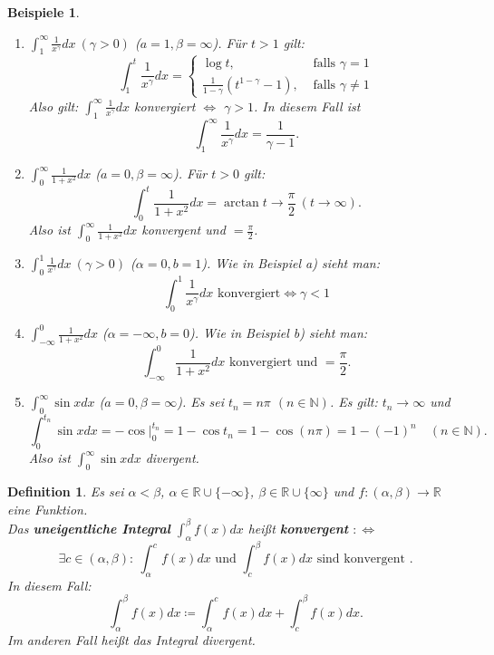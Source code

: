 \documentclass[12pt]{extreport} %
\newcommand{\N}{\mathbb{N}}
\newcommand{\R}{\mathbb{R}}
\theoremstyle{named}
\theoremstyle{itshape}
\newtheorem*{definition}{Definition}
\theoremstyle{normal}
\newtheorem*{beispiele}{Beispiele}
\begin{document}
{\begin{beispiele} ~\
	\begin{enumerate}
		\item $\int_{1}^{\infty} \frac{1}{x^{\gamma}} dx ~(\gamma >0)$ ($a = 1, \beta = \infty$). Für $t > 1$ gilt: \label{11.0:bsp-obigeBspa}
			$$ \int_{1}^{t} \frac{1}{x^{\gamma}} dx = \begin{cases} \log t, & \text{ falls } \gamma = 1 \\ 
			\frac{1}{1 - \gamma} (t^{1 - \gamma} - 1), & \text{ falls } \gamma \neq 1 \end{cases} $$
			Also gilt: $\int_{1}^{\infty} \frac{1}{x^{\gamma}} dx$ konvergiert $\iff$ $\gamma > 1$. In diesem Fall ist
			$$ \int_{1}^{\infty} \frac{1}{x^{\gamma}} dx = \frac{1}{\gamma - 1}. $$
		\item $\int_{0}^{\infty} \frac{1}{1 + x^{2}} dx$ ($a = 0, \beta = \infty$). Für $t > 0$ gilt:
			$$ \int_{0}^{t} \frac{1}{1 + x^{2}} dx = \arctan t \rightarrow \frac{\pi}{2} ~(t \rightarrow \infty). $$ \label{11.0:bsp-obigeBspb}
			Also ist $\int_{0}^{\infty} \frac{1}{1 + x^{2}} dx$ konvergent und $= \frac{\pi}{2}$.
		\item $\int_{0}^{1} \frac{1}{x^{\gamma}} dx ~(\gamma > 0)$ ($\alpha = 0, b = 1$). Wie in Beispiel a) sieht man: \label{11.0:bsp-obigeBspc}
			$$ \int_{0}^{1} \frac{1}{x^{\gamma}} dx \text{ konvergiert} \iff \gamma < 1 $$
		\item $\int_{-\infty}^{0} \frac{1}{1 + x^{2}} dx$ ($\alpha = -\infty, b = 0$). Wie in Beispiel b) sieht man: \label{11.0:bsp-obigeBspd}
			$$ \int_{-\infty}^{0} \frac{1}{1 + x^{2}} dx  \text{ konvergiert und } = \frac{\pi}{2}. $$
		\item $\int_{0}^{\infty} \sin x dx$  ($a = 0, \beta = \infty$). Es sei $t_{n} = n \pi$ $(n \in \N)$. Es gilt: $t_n \to \infty$ und \label{11.0:bsp-obigeBspe}
			$$ \int_{0}^{t_{n}} \sin x dx = -\cos \Big|_{0}^{t_{n}} = 1 - \cos t_{n} = 1 - \cos(n\pi) = 1 - (-1)^n \quad (n \in \N).$$
			Also ist $\int_{0}^{\infty} \sin x dx$ divergent.
	\end{enumerate}	
\end{beispiele}

\begin{definition}
	Es sei $\alpha < \beta$, $\alpha \in \R \cup \{ - \infty \}$, $\beta \in \R \cup \{ \infty \}$ und $f \colon (\alpha, \beta) \rightarrow \R$ eine Funktion. \\
	Das \textbf{uneigentliche Integral} $\int_{\alpha}^{\beta} f(x) dx$ hei{\ss}t \textbf{konvergent} $:\iff$ 
	$$\exists c \in (\alpha, \beta): ~ \int_{\alpha}^{c} f(x) dx \text{ und } \int_{c}^{\beta} f(x) dx \text{ sind konvergent }.$$ In diesem Fall:
	$$ \int_{\alpha}^{\beta} f(x) dx \coloneqq \int_{\alpha}^{c} f(x) dx + \int_{c}^{\beta} f(x) dx. $$
	Im anderen Fall hei{\ss}t das Integral divergent.
\end{definition}

}
\end{document}
